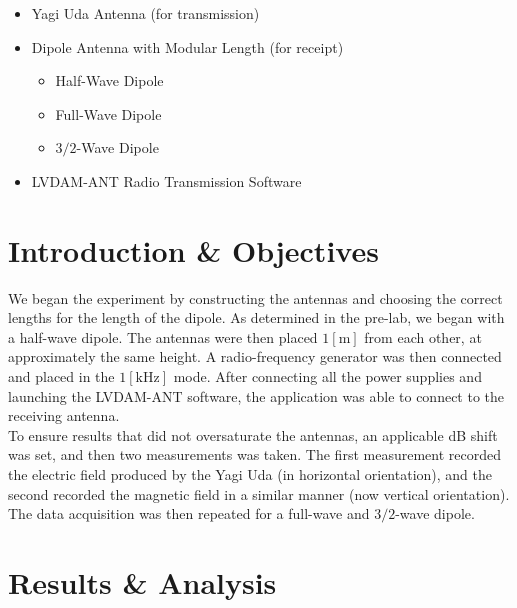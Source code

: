 \documentclass[
	letterpaper, %
	10pt, %
]{CSUniSchoolLabReport}
\begin{document}
\begin{itemize}

  \item Yagi Uda Antenna (for transmission)

  \item Dipole Antenna with Modular Length (for receipt)

    \begin{itemize}

      \item Half-Wave Dipole

      \item Full-Wave Dipole

      \item $3/2$-Wave Dipole

    \end{itemize}

  \item LVDAM-ANT Radio Transmission Software

\end{itemize}

\section{Introduction \& Objectives}

We began the experiment by constructing the antennas and choosing the correct lengths for the length of the dipole. As determined in the pre-lab, we began with a half-wave dipole. The antennas were then placed $1[\si{\meter}]$ from each other, at approximately the same height. A radio-frequency generator was then connected and placed in the $1[\si{\kilo\hertz}]$ mode. After connecting all the power supplies and launching the LVDAM-ANT software, the application was able to connect to the receiving antenna.\\

To ensure results that did not oversaturate the antennas, an applicable dB shift was set, and then two measurements was taken. The first measurement recorded the electric field produced by the Yagi Uda (in horizontal orientation), and the second recorded the magnetic field in a similar manner (now vertical orientation). The data acquisition was then repeated for a full-wave and $3/2$-wave dipole.

\section{Results \& Analysis} 
\end{document}
